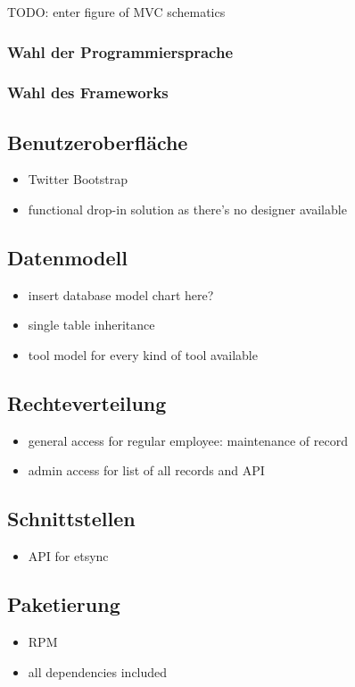 TODO: enter figure of MVC schematics

\subsubsection{Wahl der Programmiersprache}
\label{sec:Wahl der Programmiersprache}

\subsubsection{Wahl des Frameworks}
\label{sec:Wahl des Frameworks}


\subsection{Benutzeroberfläche}
\label{sec:Benutzeroberfläche}
\begin{itemize}
	\item Twitter Bootstrap
	\item functional drop-in solution as there's no designer available
\end{itemize}

\subsection{Datenmodell}
\label{sec:Datenmodell}
\begin{itemize}
	\item insert database model chart here?
	\item single table inheritance
	\item tool model for every kind of tool available
\end{itemize}

\subsection{Rechteverteilung}
\label{sec:Rechteverteilung}
\begin{itemize}
	\item general access for regular employee: maintenance of record
	\item admin access for list of all records and API
\end{itemize}

\subsection{Schnittstellen}
\label{sec:Schnittstellen}
\begin{itemize}
	\item API for etsync
\end{itemize}

\subsection{Paketierung}
\label{sec:Paketierung}
\begin{itemize}
	\item RPM
	\item all dependencies included
\end{itemize}
